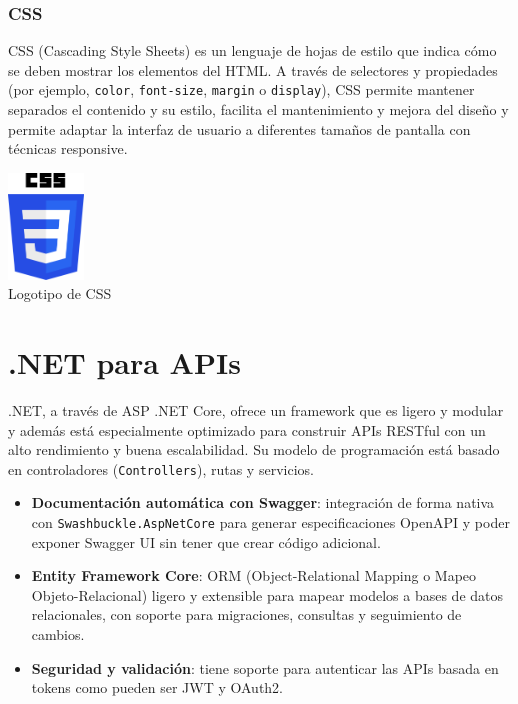 \subsubsection{CSS}

CSS (Cascading Style Sheets) es un lenguaje de hojas de estilo que indica cómo se deben mostrar los elementos del HTML. A través de selectores y propiedades (por ejemplo, \texttt{color}, \texttt{font-size}, \texttt{margin} o \texttt{display}), CSS permite mantener separados el contenido y su estilo, facilita el mantenimiento y mejora del diseño y permite adaptar la interfaz de usuario a diferentes tamaños de pantalla con técnicas responsive.

\begin{center}
  \includegraphics[width=0.15\textwidth]{img/css-logo.png}\\
  \small Logotipo de CSS
\end{center}


\section{.NET para APIs}\label{net}

.NET, a través de ASP .NET Core, ofrece un framework que es ligero y modular y además está especialmente optimizado para construir APIs RESTful con un alto rendimiento y buena escalabilidad. Su modelo de programación está basado en controladores (\texttt{Controllers}), rutas y servicios.

\begin{itemize} 
  \item \textbf{Documentación automática con Swagger}: integración de forma nativa con \texttt{Swashbuckle.AspNetCore} para generar especificaciones OpenAPI y poder exponer Swagger UI sin tener que crear código adicional.  
  \item \textbf{Entity Framework Core}: ORM (Object-Relational Mapping o Mapeo Objeto-Relacional) ligero y extensible para mapear modelos a bases de datos relacionales, con soporte para migraciones, consultas y seguimiento de cambios.  
  \item \textbf{Seguridad y validación}: tiene soporte para autenticar las APIs basada en tokens como pueden ser JWT y OAuth2.  
\end{itemize}

